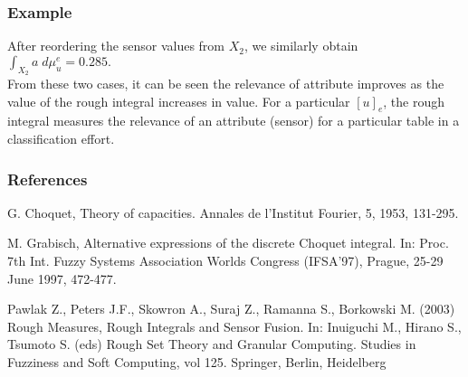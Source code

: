 \documentclass[envcountsect]{beamer}
\begin{document}
\begin{frame}
	\frametitle{Example}
	After reordering the sensor values from $X_2$, we similarly obtain $\int_{X_{2}} a \; d\mu_u^e = 0.285.$ \\ 
	\vfill
	From these two cases, it can be seen the relevance of attribute improves as the value of the rough integral increases in value. For a particular $[u]_e$, the rough integral measures the relevance of an attribute (sensor) for a particular table in a classification effort. \\
\end{frame}
\begin{frame}
	\frametitle{References}
	G. Choquet, Theory of capacities. Annales de l'Institut Fourier, 5, 1953, 131-295.\\
	\vfill

	M. Grabisch, Alternative expressions of the discrete Choquet integral. In: Proc. 7th Int. Fuzzy Systems Association Worlds Congress (IFSA'97), Prague, 25-29 June 1997, 472-477.\\

	\vfill

Pawlak Z., Peters J.F., Skowron A., Suraj Z., Ramanna S., Borkowski M. (2003) Rough Measures, Rough Integrals and Sensor Fusion. In: Inuiguchi M., Hirano S., Tsumoto S. (eds) Rough Set Theory and Granular Computing. Studies in Fuzziness and Soft Computing, vol 125. Springer, Berlin, Heidelberg

\end{frame}
	
\end{document}

